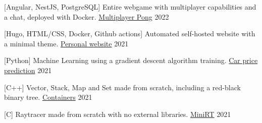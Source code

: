 
\begin{cventries}

  \cventry
    {[Angular, NestJS, PostgreSQL] Entire webgame with multiplayer capabilities and a chat, deployed with Docker.}
    {\href{https://github.com/pruiz-ca/ft_transcendence}{Multiplayer Pong}}
    {}
    {2022}
    {}

  \cventry
    {[Hugo, HTML/CSS, Docker, Github actions] Automated self-hosted website with a minimal theme.}
    {\href{https://github.com/pruiz-ca/pedroruiz.xyz}{Personal website}}
    {}
    {2021}
    {}

  \cventry
    {[Python] Machine Learning using a gradient descent algorithm training.}
    {\href{https://github.com/pruiz-ca/ft_linear_regression}{Car price prediction}}
    {}
    {2021}
    {}


  \cventry
    {[C++] Vector, Stack, Map and Set made from scratch, including a red-black binary tree.}
    {\href{https://github.com/pruiz-ca/ft_containers}{Containers}}
    {}
    {2021}
    {}


  \cventry
    {[C] Raytracer made from scratch with no external libraries.}
    {\href{https://github.com/pruiz-ca/miniRT}{MiniRT}}
    {}
    {2021}
    {}

\end{cventries}
